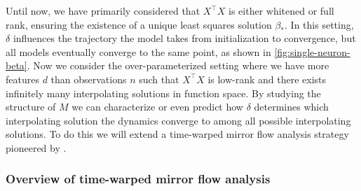 \documentclass{article}
\theoremstyle{plain}
\theoremstyle{definition}
\theoremstyle{remark}
\begin{document}
Until now, we have primarily considered that $X^\intercal X$ is either whitened or full rank, ensuring the existence of a unique least squares solution $\beta_*$.
%
In this setting, $\delta$ influences the trajectory the model takes from initialization to convergence, but all models eventually converge to the same point, as shown in \cref{fig:single-neuron-beta}.
%
Now we consider the over-parameterized setting where we have more features $d$ than observations $n$ such that $X^\intercal X$ is low-rank and there exists infinitely many interpolating solutions in function space.
%
By studying the structure of $M$ we can characterize or even predict how $\delta$ determines which interpolating solution the dynamics converge to among all possible interpolating solutions.
%
To do this we will extend a time-warped mirror flow analysis strategy pioneered by \citet{azulay2021implicit}.


\subsubsection{Overview of time-warped mirror flow analysis}
\label{app:mirror-flow-analysis}
\end{document}
